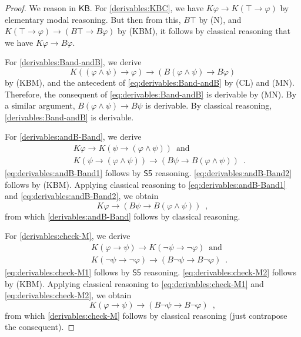 \documentclass[12pt]{article}
\theoremstyle{definition}
\newcommand{\KB}{{\mathsf{KB}}}                 %
\begin{document}
\begin{proof}
  We reason in $\KB$. For \ref{derivables:KBC}, we have $K\varphi\to
  K(\top\to\varphi)$ by elementary modal reasoning.  But then from
  this, $B\top$ by (N), and $K(\top\to\varphi)\to(B\top\to
  B\varphi)$ by (KBM), it follows by classical reasoning that we have
  $K\varphi\to B\varphi$.

  For \ref{derivables:Band-andB}, we derive
  \begin{equation}
    K((\varphi\land\psi)\to\varphi)\to(B(\varphi\land\psi)\to B\varphi)
    \label{eq:derivables:Band-andB}
  \end{equation}
  by (KBM), and the antecedent of \eqref{eq:derivables:Band-andB} by
  (CL) and (MN).  Therefore, the consequent of
  \eqref{eq:derivables:Band-andB} is derivable by (MN).  By a similar
  argument, $B(\varphi\land\psi)\to B\psi$ is derivable.  By classical
  reasoning, \ref{derivables:Band-andB} is derivable.
  
  For \ref{derivables:andB-Band}, we derive
  \begin{eqnarray}
    &&
    K\varphi\to K(\psi\to(\varphi\land\psi)) \enspace\text{and}
    \label{eq:derivables:andB-Band1}
    \\
    &&
       K(\psi\to(\varphi\land\psi))\to(B\psi\to B(\varphi\land\psi)) \enspace\text{.}
    \label{eq:derivables:andB-Band2}
  \end{eqnarray}
  \eqref{eq:derivables:andB-Band1} follows by $\mathsf{S5}$ reasoning.
  \eqref{eq:derivables:andB-Band2} follows by (KBM).  Applying
  classical reasoning to \eqref{eq:derivables:andB-Band1} and
  \eqref{eq:derivables:andB-Band2}, we obtain
  \[
  K\varphi\to (B\psi\to B(\varphi\land\psi))\enspace,
  \]
  from which \ref{derivables:andB-Band} follows by classical
  reasoning.

  For \ref{derivables:check-M}, we derive
  \begin{eqnarray}
    &&
    K(\varphi\to\psi)\to K(\lnot\psi\to\lnot\varphi) \enspace\text{and}
    \label{eq:derivables:check-M1}
    \\
    &&
    K(\lnot\psi\to\lnot\varphi)\to(B\lnot\psi\to B\lnot\varphi) \enspace\text{.}
    \label{eq:derivables:check-M2}
  \end{eqnarray}
  \eqref{eq:derivables:check-M1} follows by $\mathsf{S5}$ reasoning.
  \eqref{eq:derivables:check-M2} follows by (KBM).  Applying classical
  reasoning to \eqref{eq:derivables:check-M1} and
  \eqref{eq:derivables:check-M2}, we obtain
  \[
  K(\varphi\to\psi)\to(B\lnot\psi\to B\lnot\varphi)\enspace,
  \]
  from which \ref{derivables:check-M} follows by classical reasoning
  (just contrapose the consequent).


\end{proof}
\end{document}
